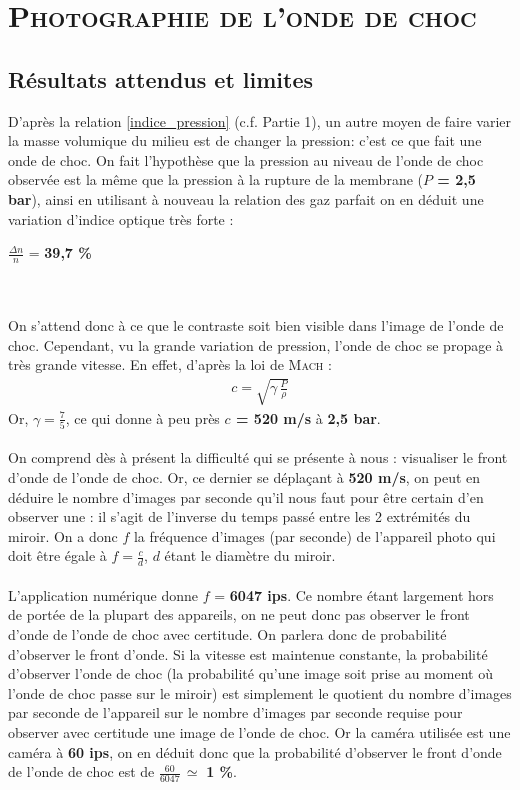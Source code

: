 \renewcommand{\chaptername}{\scshape Partie}
\chapter{\normalfont \scshape Photographie de l'onde de choc}
\section{Résultats attendus et limites}
D’après la relation \ref{indice_pression} (c.f. Partie 1), un autre moyen de faire varier la masse volumique du milieu est de changer la pression: c’est ce que fait une onde de choc. On fait l’hypothèse que la pression au niveau de l’onde de choc observée est la même que la pression à la rupture de la membrane (\textbf{$P$ = 2,5 bar}), ainsi en utilisant à nouveau la relation des gaz parfait on en déduit une variation d’indice optique très forte  : \\
\centerline{$\frac{\Delta n}{n}$ = \textbf{39,7 \%}}\\ \\
On s'attend donc à ce que le contraste soit bien visible dans l'image de l'onde de choc. Cependant, vu la grande variation de pression, l'onde de choc se propage à très grande vitesse. En effet, d'après la loi de \textsc{Mach} :
\begin{align}
	c= \sqrt{\gamma\,\frac{P}{\rho}}
\end{align}
Or, $\gamma = \frac{7}{5}$, ce qui donne à peu près \textbf{$c$ = 520 m/s} à \textbf{2,5 bar}.\\\\
On comprend dès à présent la difficulté qui se présente à nous : visualiser le front d’onde de l’onde de choc. Or, ce dernier se déplaçant à \textbf{520 m/s}, on peut en déduire le nombre d’images par seconde qu’il nous faut pour être certain d’en observer une : il s’agit de l’inverse du temps passé entre les 2 extrémités du miroir. On a donc $f$ la fréquence d’images (par seconde) de l’appareil photo qui doit être égale à $f = \frac{c}{d}$, $d$ étant le diamètre du miroir.
\\
\\
L’application numérique donne $f$ = \textbf{6047 ips}. Ce nombre étant largement hors de portée de la plupart des appareils, on ne peut donc pas observer le front d’onde de l’onde de choc avec certitude. On parlera donc de probabilité d’observer le front d’onde. Si la vitesse est maintenue constante, la probabilité d’observer l’onde de choc (la probabilité qu’une image soit prise au moment où l’onde de choc passe sur le miroir) est simplement le quotient du nombre d’images par seconde de l’appareil sur le nombre d’images par seconde requise pour observer avec certitude une image de l’onde de choc. Or la caméra utilisée est une caméra à \textbf{60 ips}, on en déduit donc que la probabilité d’observer le front d’onde de l’onde de choc est de $\frac{60}{6047}\,\simeq$ \textbf{1 \%}.
